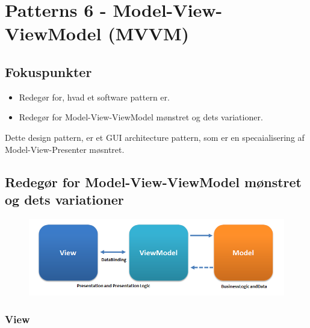 \section{Patterns 6 - Model-View-ViewModel (MVVM)}

\subsection{Fokuspunkter}

\begin{itemize}
	\item Redegør for, hvad et software pattern er.
	\item Redegør for Model-View-ViewModel mønstret og dets variationer.
\end{itemize}



Dette design pattern, er et GUI architecture pattern, som er en specaialisering af Model-View-Presenter møsntret.

\subsection{Redegør for Model-View-ViewModel mønstret og dets variationer}

\begin{figure}[h]
	\centering
	\includegraphics[width=0.7\linewidth]{figs/MVVM/MVVMPattern.png}
	\caption[Sammenhæng mellem Model-View-ViewModel]{}
	\label{fig:MVVMPattern}
\end{figure}

\subsubsection{View}


